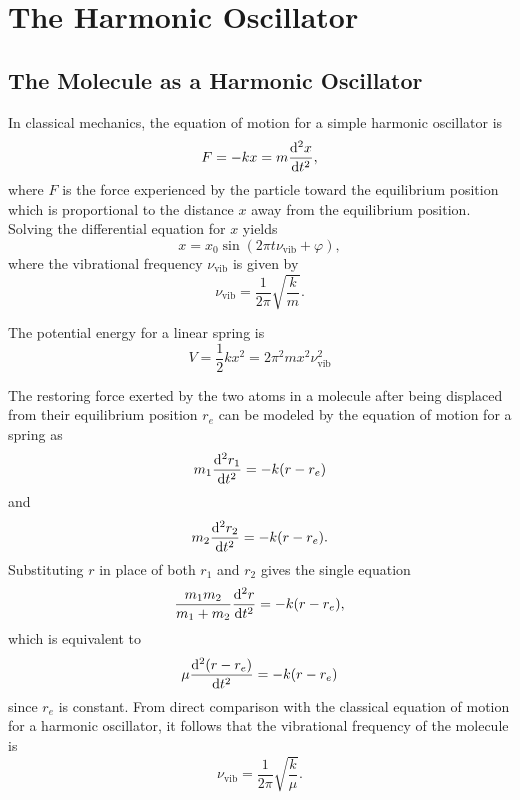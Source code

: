 \documentclass[11pt, twoside, fleqn]{report}
\newcommand{\odv}{\dv}
\newcommand{\up}{\text}
\begin{document}
\chapter{The Harmonic Oscillator}
\label{c:the_harmonic_oscillator}

\section{The Molecule as a Harmonic Oscillator}
\label{s:the_molecule_as_a_harmonic_oscillator}

In classical mechanics, the equation of motion for a simple harmonic oscillator is
\begin{equation*}
    F = -kx = m\odv[2]{x}{t},
\end{equation*}
where $F$ is the force experienced by the particle toward the equilibrium position which is proportional to the distance $x$ away from the equilibrium position. Solving the differential equation for $x$ yields
\begin{equation*}
    x = x_0\sin(2\pi t\nu_\up{vib} + \varphi),
\end{equation*}
where the vibrational frequency $\nu_\up{vib}$ is given by
\begin{equation*}
    \nu_\up{vib} = \frac{1}{2\pi}\sqrt{\frac{k}{m}}.
\end{equation*}

The potential energy for a linear spring is
\begin{equation*}
    V = \frac{1}{2}kx^2 = 2\pi^2mx^2\nu_\up{vib}^2
\end{equation*}

The restoring force exerted by the two atoms in a molecule after being displaced from their equilibrium position $r_e$ can be modeled by the equation of motion for a spring as
\begin{equation*}
    m_1\odv[2]{r_1}{t} = -k(r - r_e)
\end{equation*}
and
\begin{equation*}
    m_2\odv[2]{r_2}{t} = -k(r - r_e).
\end{equation*}
Substituting $r$ in place of both $r_1$ and $r_2$ gives the single equation
\begin{equation*}
    \frac{m_1m_2}{m_1 + m_2}\odv[2]{r}{t} = -k(r - r_e),
\end{equation*}
which is equivalent to
\begin{equation*}
    \mu\odv[2]{(r - r_e)}{t} = -k(r - r_e)
\end{equation*}
since $r_e$ is constant. From direct comparison with the classical equation of motion for a harmonic oscillator, it follows that the vibrational frequency of the molecule is
\begin{equation*}
    \nu_\up{vib} = \frac{1}{2\pi}\sqrt{\frac{k}{\mu}}.
\end{equation*}
\end{document}
